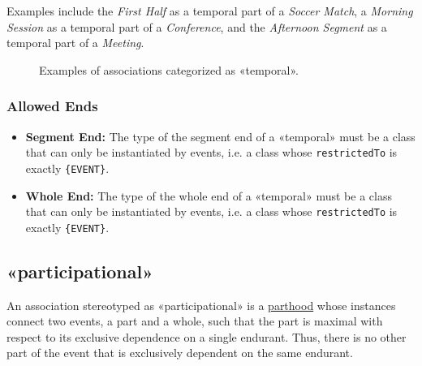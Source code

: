Examples include the \textit{First Half} as a temporal part of a \textit{Soccer Match}, a \textit{Morning Session} as a temporal part of a \textit{Conference}, and the \textit{Afternoon Segment} as a temporal part of a \textit{Meeting}.

\begin{figure}[h]
    \centering
    
    \caption{Examples of associations categorized as «temporal».}
    \label{fig:temporal-example}
\end{figure}

\subsubsection{Allowed Ends}

\begin{itemize}
    \item \textbf{Segment End:} The type of the segment end of a «temporal» must be a class that can only be instantiated by events, i.e. a class whose \texttt{restrictedTo} is exactly \texttt{\{EVENT\}}.
    \item \textbf{Whole End:} The type of the whole end of a «temporal» must be a class that can only be instantiated by events, i.e. a class whose \texttt{restrictedTo} is exactly \texttt{\{EVENT\}}.
\end{itemize}




\subsection{«participational»}
\label{stereotype:participational}

An association stereotyped as «participational» is a \hyperref[stereotype:parthood]{parthood} whose instances connect two events, a part and a whole, such that the part is maximal with respect to its exclusive dependence on a single endurant. Thus, there is no other part of the event that is exclusively dependent on the same endurant.

